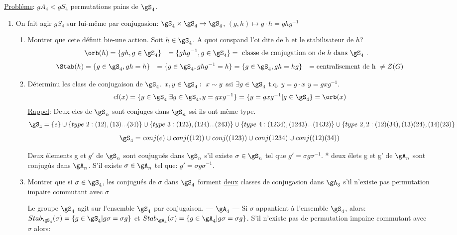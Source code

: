 \underline{Probléme}: $gA_4<gS_4$ permutations pains de $\gS_4$.
\begin{enumerate}
	\item On fait agir $gS_4$ sur lui-même par conjugasion: $\gS_4\times\gS_4\rightarrow\gS_4$, $(g,h)\mapsto g\cdot h=ghg^{-1}$
	\begin{enumerate}
		\item Montrer que cete définit bie-une action. Soit $h\in\gS_4$. A quoi conspand l'oi dite de h et le stabilisateur de $h$?
		\begin{align}
			\orb(h) &= \{gh, g\in\gS_4\}
			&= \{ghg^{-1}, g\in\gS_4\}
			&= \mbox{ classe de conjugation on de $h$ dans $\gS_4$ }.
		\end{align}
		\begin{align}
			\Stab(h) &= \{g\in\gS_4, gh=h\}
			&= \{g\in\gS_4, ghg^{-1}=h\}
			&= \{g\in\gS_4, gh=hg\}
			&= \mbox{centralisement de h } \neq Z(G)
		\end{align}
		\item Déterminu les class de conjugaison de $\gS_4$. $x,y\in \gS_4:\ x\sim y$ ssi $\exists g\in \gS_4$ t.q. $y=g\cdot x$ $y=gxg^{-1}$. 
		$$cl(x)=\{y\in\gS_4 | \exists g\in\gS_4, y=gxg^{-1}\}=\{y=gxg^{-1} | g\in\gS_4\} = \orb(x)$$
		\underline{Rappel}: Deux eles de $\gS_n$ sont conjuges dans $\gS_n$ ssi ils ont même type.
		$$\gS_4=\{e\}\cup\{type\ 2: (12),(13)...(34)\}\cup\{type\ 3:(123),(124)...(243)\}\cup\{type\ 4: (1234),(1243)...(1432)\}\cup\{type\ 2,2: (12)(34),(13)(24),(14)(23)\}$$
		$$\gS_4=conj(e)\cup conj((12))\cup conj((123))\cup conj(1234)\cup conj((12)(34))$$
	\begin{remark}
		Deux élements g et $g'$ de $\gS_n$ sont coujugués dans $\gS_n$ s'il existe $\sigma \in \gS_n$ tel que $g'=\sigma g \sigma^{-1}$.
		* deux élets g et g' de $\gA_n$ sont conjugùs dans $\gA_n$. S'il existe $\sigma\in\gA_n$ tel que: $g'=\sigma g\sigma^{-1}$.
	\end{remark}
	\item Montrer que si $\sigma\in\gS_4$, les conjugués de $\sigma$ dans $\gS_4$ forment \underline{deux} classes de conjugasion dans $\gA_3$ s'il n'existe pas permutation impaire commutant avec $\sigma$
	\begin{remark}
		Le groupe $\gS_4$ agit sur l'ensemble $\gS_4$ par conjugaison.
		--- $\gA_4$ ---
		Si $\sigma$ appantient à l'ensemble $\gS_4$, alors: $Stab_{\gS_4}(\sigma)=\{g\in\gS_4 | g\sigma=\sigma g\}$ et $Stab_{\gA_4}(\sigma)=\{g\in\gA_4 | g\sigma=\sigma g\}$. S'il n'existe pas de permutation impaine commutant avec $\sigma$ alors:

\end{remark}
\end{enumerate}
\end{enumerate}
